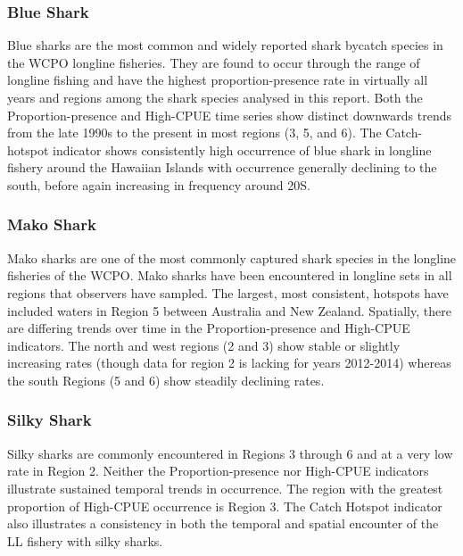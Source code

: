 \documentclass[12pt]{SCreport}
\begin{document}
        \subsubsection{Blue Shark}
Blue sharks are the most common and widely reported shark bycatch species in the WCPO longline fisheries.  They are found to occur through the range of longline fishing and have the highest proportion-presence rate in virtually all years and regions among the shark species analysed in this report.  Both the Proportion-presence and High-CPUE time series show distinct downwards trends from the late 1990s to the present in most regions (3, 5, and 6).  The Catch-hotspot indicator shows consistently high occurrence of blue shark in longline fishery around the Hawaiian Islands with occurrence generally declining to the south, before again increasing in frequency around 20\degree{}S.





\subsubsection{Mako Shark}
Mako sharks are one of the most commonly captured shark species in the longline fisheries of the WCPO.  Mako sharks have been encountered in longline sets in all regions that observers have sampled.  The largest, most consistent, hotspots have included waters in Region 5 between Australia and New Zealand.  Spatially, there are differing trends over time in the Proportion-presence and High-CPUE indicators.  The north and west regions (2 and 3) show stable or slightly increasing rates (though data for region 2 is lacking for years 2012-2014) whereas the south Regions (5 and 6) show steadily declining rates.

         
 \subsubsection{Silky Shark}
 Silky sharks are commonly encountered in Regions 3 through 6 and at a very low rate in Region 2.  Neither the Proportion-presence nor High-CPUE indicators illustrate sustained temporal trends in occurrence.  The region with the greatest proportion of High-CPUE occurrence is Region 3.  The Catch Hotspot indicator also illustrates a consistency in both the temporal and spatial encounter of the LL fishery with silky sharks.
\end{document}
